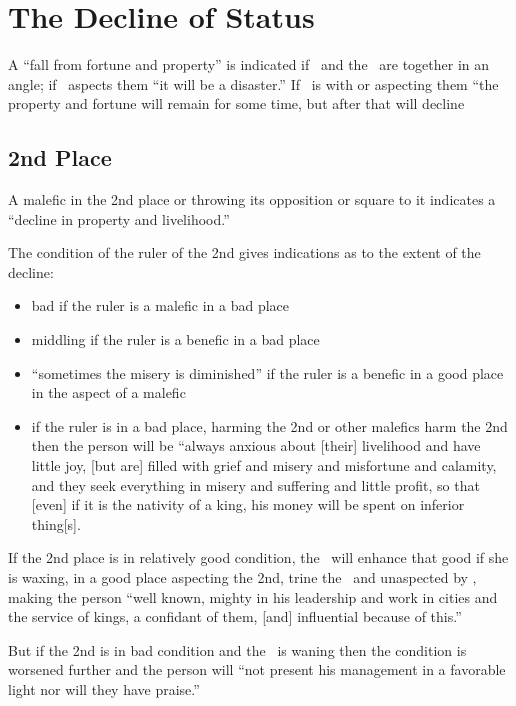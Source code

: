 \section{The Decline of Status}

A ``fall from fortune and property'' is indicated if \Saturn\, and the \Moon\, are together in an angle; if \Mars\, aspects them ``it will be a disaster.'' If \Jupiter\, is with or aspecting them ``the property and fortune will remain for some time, but after that will decline

\subsection{2nd Place}
A malefic in the 2nd place or throwing its opposition or square to it indicates a ``decline in property and livelihood.''

The condition of the ruler of the 2nd gives indications as to the extent of the decline:
\begin{itemize}[topsep=0em,itemsep=0em]
\item bad if the ruler is a malefic in a bad place
\item middling if the ruler is a benefic in a bad place
\item ``sometimes the misery is diminished'' if the ruler is a benefic in a good place in the aspect of a malefic
\item if the ruler is in a bad place, harming the 2nd or other malefics harm the 2nd then the person will be ``always anxious about [their] livelihood and have little joy, [but are] filled with grief and misery and misfortune and calamity, and they seek everything in misery and suffering and little profit, so that [even] if it is the nativity of a king, his money will be spent on inferior thing[s].
\end{itemize}

If the 2nd place is in relatively good condition, the \Moon\, will enhance that good if she is waxing, in a good place aspecting the 2nd, trine the \Sun\, and unaspected by \Mars, making the person ``well known, mighty in his leadership and work in cities and the service of kings, a confidant of them, [and] influential because of this.''

But if the 2nd is in bad condition and the \Moon\, is waning then the condition is worsened further and the person will ``not present his management in a favorable light nor will they have praise.''

